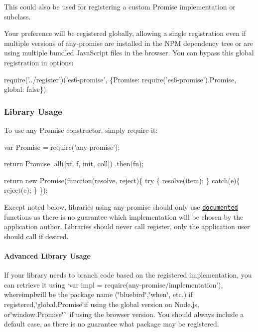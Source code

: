 This could also be used for registering a custom {\ttfamily Promise} implementation or subclass.

Your preference will be registered globally, allowing a single registration even if multiple versions of {\ttfamily any-\/promise} are installed in the N\+PM dependency tree or are using multiple bundled Java\+Script files in the browser. You can bypass this global registration in options\+:


\begin{DoxyCode}
require('../register')('es6-promise', \{Promise: require('es6-promise').Promise, global: false\})
\end{DoxyCode}


\subsubsection*{Library Usage}

To use any {\ttfamily Promise} constructor, simply require it\+:


\begin{DoxyCode}
var Promise = require('any-promise');

return Promise
  .all([xf, f, init, coll])
  .then(fn);


return new Promise(function(resolve, reject)\{
  try \{
    resolve(item);
  \} catch(e)\{
    reject(e);
  \}
\});
\end{DoxyCode}


Except noted below, libraries using {\ttfamily any-\/promise} should only use \href{https://developer.mozilla.org/en-US/docs/Web/JavaScript/Reference/Global_Objects/Promise}{\tt documented} functions as there is no guarantee which implementation will be chosen by the application author. Libraries should never call {\ttfamily register}, only the application user should call if desired.

\paragraph*{Advanced Library Usage}

If your library needs to branch code based on the registered implementation, you can retrieve it using `var impl = require(\textquotesingle{}any-\/promise/implementation'){\ttfamily , where}impl{\ttfamily will be the package name (}\char`\"{}bluebird\char`\"{}{\ttfamily ,}\char`\"{}when\char`\"{}{\ttfamily , etc.) if registered,}\char`\"{}global.\+Promise\char`\"{}{\ttfamily if using the global version on Node.\+js, or}\char`\"{}window.\+Promise\char`\"{}\`{} if using the browser version. You should always include a default case, as there is no guarantee what package may be registered.

